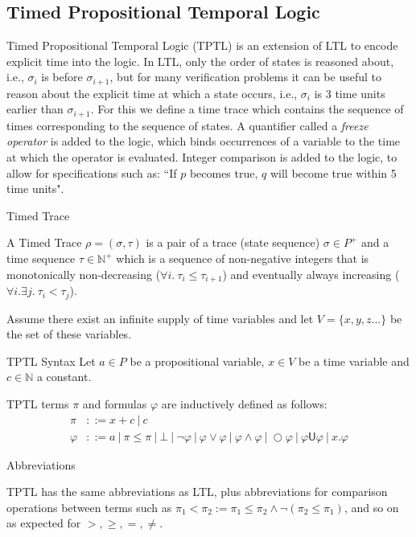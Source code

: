 \documentclass[a4paper]{article}
\newcommand{\U}{\mathsf{U}}
\begin{document}
\subsection{Timed Propositional Temporal Logic}
Timed Propositional Temporal Logic (TPTL)\autocite{alur1994really} is an extension of LTL to encode explicit time into the logic. In LTL, only the order of states is reasoned about, i.e., $\sigma_i$ is before $\sigma_{i+1}$, but for many verification problems it can be useful to reason about the explicit time at which a state occurs, i.e., $\sigma_i$ is 3 time units earlier than $\sigma_{i+1}$. For this we define a time trace which contains the sequence of times corresponding to the sequence of states. A quantifier called a \emph{freeze operator} is added to the logic, which binds occurrences of a variable to the time at which the operator is evaluated. Integer comparison is added to the logic, to allow for specifications such as: ``If $p$ becomes true, $q$ will become true within 5 time units".


\begin{defn}{Timed Trace}

  A Timed Trace $\rho = (\sigma,\tau)$ is a pair of a trace (state sequence) $\sigma \in P^+$ and a time sequence $\tau \in \mathbb{N}^+$ which is a sequence of non-negative integers that is monotonically non-decreasing ($\forall i. ~\tau_i \leq \tau_{i+1}$) and eventually always increasing ($\forall i. \exists j. ~\tau_i < \tau_j$).
\end{defn}

Assume there exist an infinite supply of time variables  and let $V=\{x,y,z...\}$ be the set of these variables.

\begin{defn}{TPTL Syntax}
  Let $a\in P$ be a propositional variable, $x\in V$ be a time variable and $c\in\mathbb{N}$ a constant.

  TPTL terms $\pi$ and formulas $\varphi$ are inductively defined as follows:
  \begin{align*}
    \pi &::= x + c ~|~ c\\
    \varphi &::= a ~|~ \pi \leq \pi ~|~ \bot ~|~ \neg \varphi ~|~\varphi \lor \varphi ~|~ \varphi \land \varphi ~|~ \bigcirc \varphi ~|~ \varphi \U \varphi ~|~ x. \varphi
  \end{align*}
\end{defn}

\begin{notn}{Abbreviations}

  TPTL has the same abbreviations as LTL, plus abbreviations for comparison operations between terms such as $\pi_1 < \pi_2 := \pi_1 \leq \pi_2 \land \neg(\pi_2 \leq \pi_1)$, and so on as expected for $>,\geq,=,\neq$.
\end{notn}
\end{document}
